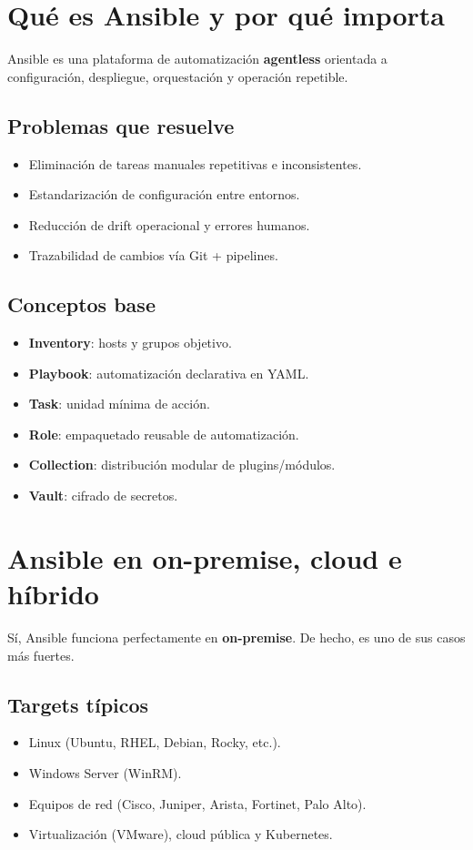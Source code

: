 \documentclass[12pt,a4paper]{article}
\begin{document}
\section{Qué es Ansible y por qué importa}

Ansible es una plataforma de automatización \textbf{agentless} orientada a configuración, despliegue, orquestación y operación repetible.

\subsection{Problemas que resuelve}
\begin{itemize}
  \item Eliminación de tareas manuales repetitivas e inconsistentes.
  \item Estandarización de configuración entre entornos.
  \item Reducción de drift operacional y errores humanos.
  \item Trazabilidad de cambios vía Git + pipelines.
\end{itemize}

\subsection{Conceptos base}
\begin{itemize}
  \item \textbf{Inventory}: hosts y grupos objetivo.
  \item \textbf{Playbook}: automatización declarativa en YAML.
  \item \textbf{Task}: unidad mínima de acción.
  \item \textbf{Role}: empaquetado reusable de automatización.
  \item \textbf{Collection}: distribución modular de plugins/módulos.
  \item \textbf{Vault}: cifrado de secretos.
\end{itemize}

\section{Ansible en on-premise, cloud e híbrido}

Sí, Ansible funciona perfectamente en \textbf{on-premise}. De hecho, es uno de sus casos más fuertes.

\subsection{Targets típicos}
\begin{itemize}
  \item Linux (Ubuntu, RHEL, Debian, Rocky, etc.).
  \item Windows Server (WinRM).
  \item Equipos de red (Cisco, Juniper, Arista, Fortinet, Palo Alto).
  \item Virtualización (VMware), cloud pública y Kubernetes.
\end{itemize}
\end{document}
